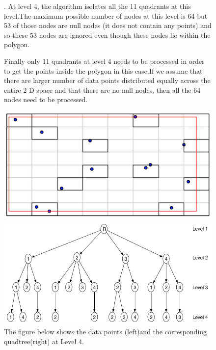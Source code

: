 \documentclass{article}
\begin{document}
\begin{figure}[H]

.
At level 4, the algorithm isolates all the 11 quadrants at this level.The maximum possible number of nodes at this level is 64 but 53 of  those nodes are null nodes (it does not contain any points) and so these 53 nodes are ignored even though these nodes lie within the polygon.

Finally only 11 quadrants at level 4 needs to be processed in order to get the points inside the polygon in this case.If we assume that there are larger number of data points distributed equally across the entire 2 D space and that there are no null nodes, then all the 64 nodes need to be processed.

  \centering
  \begin{minipage}[b]{0.35\textwidth}
    \includegraphics[width=\textwidth]{4Quad1_4}  
  \end{minipage}
  \hfill
  \begin{minipage}[b]{0.6\textwidth}
    \includegraphics[width=\textwidth]{1_1Quad_4_tree}
  \end{minipage}
  \caption{The figure below shows the data points (left)and the corresponding quadtree(right) at Level 4.}
\end{figure}
\end{document}

